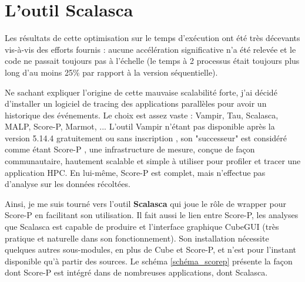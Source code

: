 \documentclass[11pt,a4paper,oneside]{memoir}
\theoremstyle{definition}
\theoremstyle{remark}
\theoremstyle{plain}
\begin{document}
\section{L'outil Scalasca}

Les résultats de cette optimisation sur le temps d'exécution ont été très décevants vis-à-vis des efforts fournis : aucune accélération significative n'a été relevée et le code ne passait toujours pas à l'échelle (le temps à 2 processus était toujours plus long d'au moins 25\% par rapport à la version séquentielle).\bigskip

Ne sachant expliquer l'origine de cette mauvaise scalabilité forte, j'ai décidé d'installer un logiciel de tracing des applications parallèles pour avoir un historique des événements. Le choix est assez vaste : Vampir, Tau, Scalasca, MALP, Score-P, Marmot, ... L'outil Vampir n'étant pas disponible après la version 5.14.4 gratuitement ou sans inscription \cite{vampir}, son "successeur" est considéré comme étant Score-P \cite{score-p}, une infrastructure de mesure, conçue de façon communautaire, hautement scalable et simple à utiliser pour profiler et tracer une application HPC. En lui-même, Score-P est complet, mais n'effectue pas d'analyse sur les données récoltées.\medskip

Ainsi, je me suis tourné vers l'outil \textbf{Scalasca} \cite{scalasca} qui joue le rôle de wrapper pour Score-P en facilitant son utilisation. Il fait aussi le lien entre Score-P, les analyses que Scalasca est capable de produire et l'interface graphique CubeGUI (très pratique et naturelle dans son fonctionnement). Son installation nécessite quelques autres sous-modules, en plus de Cube et Score-P, et n'est pour l'instant disponible qu'à partir des sources. Le schéma \ref{schéma_scorep} présente la façon dont Score-P est intégré dans de nombreuses applications, dont Scalasca.\medskip
\end{document}
